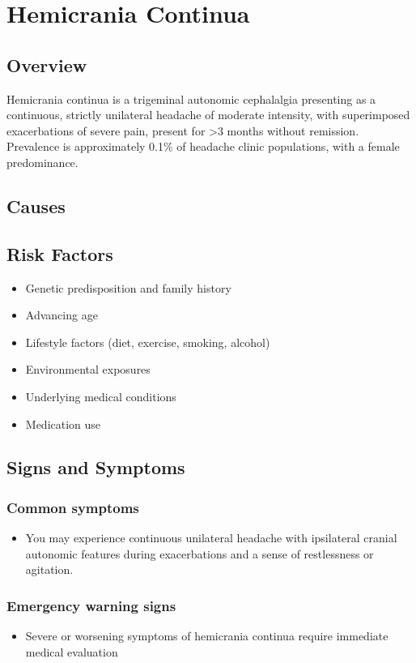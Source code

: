 \chapter{Hemicrania Continua}
\label{sec:Hemicrania Continua}

\section{Overview}
Hemicrania continua is a trigeminal autonomic cephalalgia presenting as a continuous, strictly unilateral headache of moderate intensity, with superimposed exacerbations of severe pain, present for >3 months without remission. Prevalence is approximately 0.1\% of headache clinic populations, with a female predominance.
\section{Causes}
\section{Risk Factors}

\begin{itemize}[noitemsep]
  \item Genetic predisposition and family history
  \item Advancing age
  \item Lifestyle factors (diet, exercise, smoking, alcohol)
  \item Environmental exposures
  \item Underlying medical conditions
  \item Medication use
\end{itemize}
\section{Signs and Symptoms}

\subsection{Common symptoms}
\begin{itemize}[noitemsep]
  \item You may experience continuous unilateral headache with ipsilateral cranial autonomic features during exacerbations and a sense of restlessness or agitation. 
  \end{itemize}

\subsection{Emergency warning signs}
\begin{itemize}[noitemsep]
  \item Severe or worsening symptoms of hemicrania continua require immediate medical evaluation
\end{itemize}
